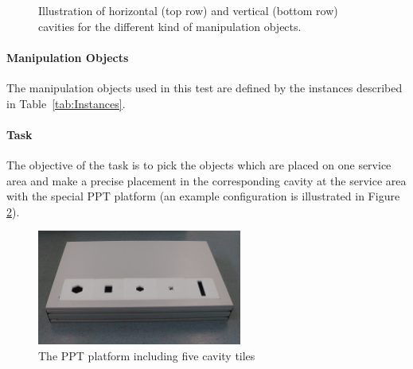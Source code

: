 \begin{figure} [h!]
\begin{center}
 \hspace{0.1cm}
  \hspace{0.1cm}
  \hspace{0.1cm}
\end{center}
\caption{Illustration of horizontal (top row) and vertical (bottom row) cavities for the different kind of manipulation objects.}
\label{fig:ppt_tiles}
\end{figure}


\paragraph{Manipulation Objects}
The manipulation objects used in this test are defined by the instances described in Table~\ref{tab:Instances}.

\paragraph{Task}
The objective of the task is to pick the objects which are placed on one service area and make a precise placement in the corresponding cavity at the service area with the special PPT platform (an example configuration is illustrated in Figure \ref{fig:ppt_plattform}). 

\begin{figure}
\centering
\includegraphics[width=0.6\textwidth ]{./images/ppt_plattform.jpg}
\caption{The PPT platform including five cavity tiles}
\label{fig:ppt_plattform}
\end{figure}

